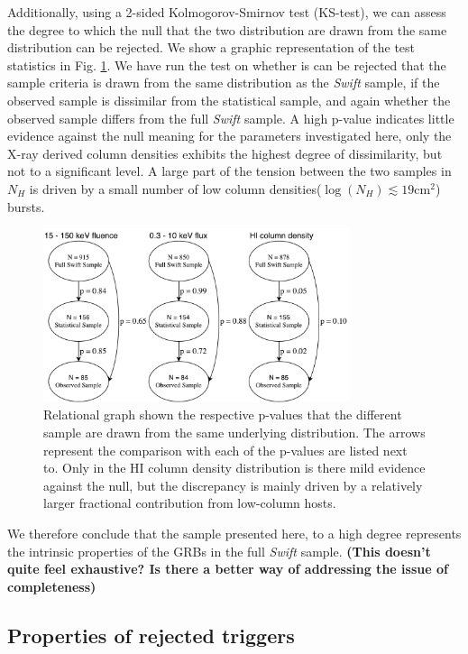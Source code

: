 \documentclass{aa}    %
\newcommand\todo[1]{\textbf{(#1)}}
\begin{document}
Additionally, using a 2-sided Kolmogorov-Smirnov test (KS-test), we can assess
the degree to which the null that the two distribution are drawn from the same
distribution can be rejected. We show a graphic representation of the test
statistics in Fig. \ref{fig:p_values}. We have run the test on whether is can be
rejected that the sample criteria is drawn from the same distribution as the
\textit{Swift} sample, if the observed sample is dissimilar from the statistical
sample, and again whether the observed sample differs from the full
\textit{Swift} sample. A high p-value indicates little evidence against the null
meaning for the parameters investigated here, only the X-ray derived column
densities exhibits the highest degree of dissimilarity, but not to a significant
level. A large part of the tension between the two samples in $N_H$ is driven by
a small number of low column densities($\log(N_H) \lesssim 19 \mathrm{cm}^2$)
bursts.

\begin{figure}
	\centerline{\includegraphics[width=9cm]{figures/XSGRB_p_values.pdf}}
	\caption{Relational graph shown the respective p-values that the different
	sample are drawn from the same underlying distribution. The arrows represent
	the comparison with each of the p-values are listed next to. Only in the HI
	column density distribution is there mild evidence against the null, but the
	discrepancy is mainly driven by a relatively larger fractional contribution
	from low-column hosts.}
	\label{fig:p_values}
\end{figure}

We therefore conclude that the sample presented here, to a high degree
represents the intrinsic properties of the GRBs in the full \textit{Swift} sample.
\todo{This doesn't quite feel exhaustive? Is there a better way of addressing the issue of completeness}

\subsection{Properties of rejected triggers} \label{badbursts}
\end{document}
